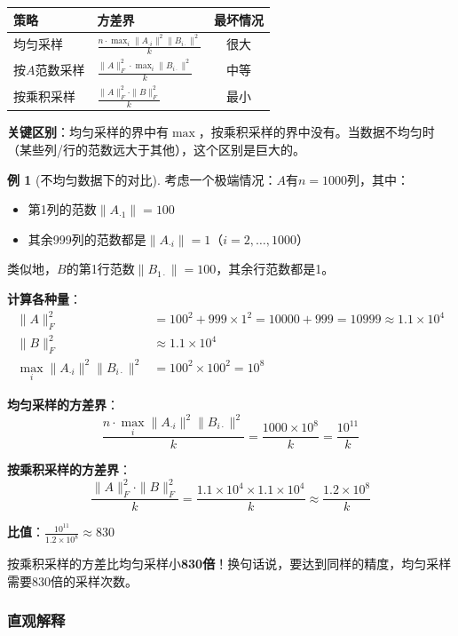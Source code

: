 \documentclass[11pt,a4paper]{ctexart}
\theoremstyle{definition}
\newtheorem{example}[theorem]{例}
\theoremstyle{remark}
\begin{document}
\begin{center}
\begin{tabular}{llc}
\toprule
策略 & 方差界 & 最坏情况 \\
\midrule
均匀采样 & $\displaystyle\frac{n \cdot \max_i \|A_{\cdot i}\|^2 \|B_{i\cdot}\|^2}{k}$ & 很大 \\[2ex]
按$A$范数采样 & $\displaystyle\frac{\|A\|_F^2 \cdot \max_i \|B_{i\cdot}\|^2}{k}$ & 中等 \\[2ex]
按乘积采样 & $\displaystyle\frac{\|A\|_F^2 \cdot \|B\|_F^2}{k}$ & 最小 \\
\bottomrule
\end{tabular}
\end{center}

\textbf{关键区别}：均匀采样的界中有$\max$，按乘积采样的界中没有。当数据不均匀时（某些列/行的范数远大于其他），这个区别是巨大的。

\begin{example}[不均匀数据下的对比]
考虑一个极端情况：$A$有$n=1000$列，其中：
\begin{itemize}
    \item 第1列的范数$\|A_{\cdot 1}\| = 100$
    \item 其余999列的范数都是$\|A_{\cdot i}\| = 1$（$i = 2, \ldots, 1000$）
\end{itemize}
类似地，$B$的第1行范数$\|B_{1\cdot}\| = 100$，其余行范数都是1。

\textbf{计算各种量}：
\begin{align*}
\|A\|_F^2 &= 100^2 + 999 \times 1^2 = 10000 + 999 = 10999 \approx 1.1 \times 10^4 \\
\|B\|_F^2 &\approx 1.1 \times 10^4 \\
\max_i \|A_{\cdot i}\|^2 \|B_{i\cdot}\|^2 &= 100^2 \times 100^2 = 10^8
\end{align*}

\textbf{均匀采样的方差界}：
\[
\frac{n \cdot \max_i \|A_{\cdot i}\|^2 \|B_{i\cdot}\|^2}{k} = \frac{1000 \times 10^8}{k} = \frac{10^{11}}{k}
\]

\textbf{按乘积采样的方差界}：
\[
\frac{\|A\|_F^2 \cdot \|B\|_F^2}{k} = \frac{1.1 \times 10^4 \times 1.1 \times 10^4}{k} \approx \frac{1.2 \times 10^8}{k}
\]

\textbf{比值}：$\frac{10^{11}}{1.2 \times 10^8} \approx 830$

按乘积采样的方差比均匀采样小\textbf{830倍}！换句话说，要达到同样的精度，均匀采样需要830倍的采样次数。
\end{example}

\subsubsection{直观解释}
\end{document}

